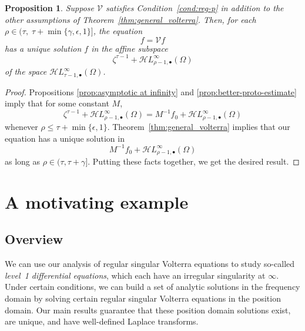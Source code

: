 \documentclass{article}
\theoremstyle{definition}
\theoremstyle{plain}
\newtheorem{proposition}{Proposition}
\newcommand{\singexp}[2]{\mathcal{H}L^\infty_{#1, #2}}
\newcommand{\singexpalg}[1]{\singexp{#1}{\bullet}}
\newcommand{\volterra}{\mathcal{V}}
\newcommand{\solproto}{f_0}
\newcommand{\domain}{\Omega}
\begin{document}
\begin{proposition}\label{prop:alt-general_volterra}
Suppose $\volterra$ satisfies {\em Condition~\eqref{cond:reg-p}} in addition to the other assumptions of {\em Theorem~\ref{thm:general_volterra}}. Then, for each $\rho \in (\tau,\;\tau + \min\{\gamma, \epsilon, 1\}]$, the equation
\[f = \volterra f\]
has a unique solution $f$ in the affine subspace
\[ \zeta^{\tau-1}+\singexpalg{\rho-1}(\domain) \]
of the space $\singexpalg{\tau-1}(\domain)$.
\end{proposition}
\begin{proof}
Propositions \ref{prop:asymptotic at infinity} and \ref{prop:better-proto-estimate} imply that for some constant $M$,
\[ \zeta^{\tau-1} + \singexpalg{\rho-1}(\domain) = M^{-1}\solproto + \singexpalg{\rho-1}(\domain) \]
whenever $\rho \le \tau + \min\{\epsilon, 1\}$. Theorem~\ref{thm:general_volterra} implies that our equation has a unique solution in
\[ M^{-1}\solproto + \singexpalg{\rho-1}(\domain) \]
as long as $\rho \in (\tau, \tau + \gamma]$. Putting these facts together, we get the desired result.
\end{proof}
\section{A motivating example}\label{sec:example}
\subsection{Overview}
We can use our analysis of regular singular Volterra equations to study so-called \textit{level~1 differential equations}, which each have an irregular singularity at $\infty$. Under certain conditions, we can build a set of analytic solutions in the frequency domain by solving certain regular singular Volterra equations in the position domain. Our main results guarantee that these position domain solutions exist, are unique, and have well-defined Laplace transforms.
\end{document}
